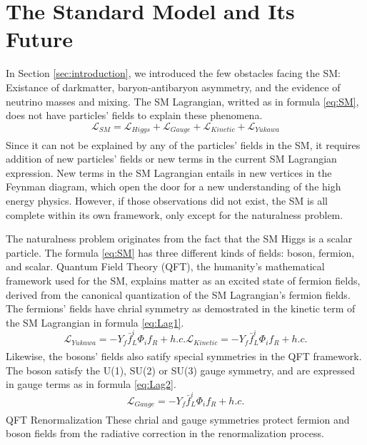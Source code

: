 \chapter{The Standard Model and Its Future}\label{sec:theory}

In Section \ref{sec:introduction}, we introduced the few obstacles facing the SM: Existance of darkmatter, baryon-antibaryon asymmetry, and the evidence of neutrino masses and mixing. 
The SM Lagrangian, writted as in formula \ref{eq:SM}, does not have particles' fields to explain these phenomena.
\begin{equation}
\label{eq:SM}
\mathcal{L}_{SM} = \mathcal{L}_{Higgs}+\mathcal{L}_{Gauge}+\mathcal{L}_{Kinetic}+\mathcal{L}_{Yukawa}
\end{equation}
\begin{align*}
\end{align*}
Since it can not be explained by any of the particles' fields in the SM, it requires addition of new particles' fields or new terms in the current SM Lagrangian expression.
New terms in the SM Lagrangian entails in new vertices in the Feynman diagram, which open the door for a new understanding of the high energy physics.
However, if those observations did not exist, the SM is all complete within its own framework, only except for the naturalness problem.

The naturalness problem originates from the fact that the SM Higgs is a scalar particle.
The formula \ref{eq:SM} has three different kinds of fields: boson, fermion, and scalar.
Quantum Field Theory (QFT), the humanity's  mathematical framework used for the SM, explains matter as an excited state of fermion fields, derived from the canonical quantization of the SM Lagrangian's fermion fields.
The fermions' fields have chrial symmetry as demostrated in the kinetic term of the SM Lagrangian in formula \ref{eq:Lag1}.
\begin{equation}
\label{eq:Lag1}
	\mathcal{L}_{Yukawa}  = -Y_{f}\bar{f}_{L}^{i}\Phi_{i}f_{R} +h.c.
	\mathcal{L}_{Kinetic} = -Y_{f}\bar{f}_{L}^{i}\Phi_{i}f_{R} +h.c.
\end{equation}
\begin{align*}
\end{align*}
Likewise, the bosons' fields also satify special symmetries in the QFT framework.
The boson satisfy the U(1), SU(2) or SU(3) gauge symmetry, and are expressed in gauge terms as in formula \ref{eq:Lag2}.
\begin{equation}
\label{eq:Lag2}
	\mathcal{L}_{Gauge} = -Y_{f}\bar{f}_{L}^{i}\Phi_{i}f_{R} +h.c.
\end{equation}
\begin{align*}
\end{align*}
QFT Renormalization
These chrial and gauge symmetries protect fermion and boson fields from the radiative correction in the renormalization process.

